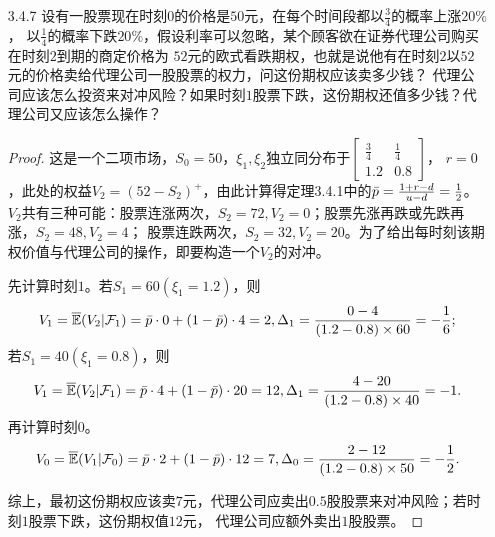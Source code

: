 \begin{enumerate}
\begin{proof}
        与前面对二项市场的分析同理，由$\F_n=\sigma(\xi_1,\cdots,\xi_n)$知$(\Omega,\F_n)$上的
        概率测度$\bP$由$\bP(\xi_i=u_j)(1\leqslant i\leqslant n,1\leqslant j\leqslant k)$全体唯一确定，
        记$p_j^{(i)}=\bP(\xi_i=u_j)$。为使$\bP$是等价鞅测度，对任意$1\leqslant i\leqslant n$，
        同理有$1+r=\bE\xi_i=\sum\limits_{j=1}^kp_j^{(i)}u_j$。当$k\geqslant3$时，由于$u_1<1+r<u_k$，
        故对任意$1\leqslant i\leqslant n$，均有不止一组$(p_1^{(i)},\cdots,p_k^{(i)})$符合要求，如
        \[\bigg(\frac{2u_k+\sum_{j=2}^{k-1}u_j}{n(u_k-u_1)}-\frac{1+r}{u_k-u_1},\frac{1}{n},\cdots,
        \frac{1}{n},\frac{1+r}{u_k-u_1}-\frac{2u_1+\sum_{j=2}^{k-1}u_j}{n(u_k-u_1)}\bigg)\]或
        \[\bigg(\frac{(n+2)u_k+\sum_{j=2}^{k-1}u_j}{2n(u_k-u_1)}-\frac{1+r}{u_k-u_1},\frac{1}{2n},\cdots,
        \frac{1}{2n},\frac{1+r}{u_k-u_1}-\frac{(n+2)u_1+\sum_{j=2}^{k-1}u_j}{2n(u_k-u_1)}\bigg),\]
        此时的$\bP$均与$\P$等价，从而$\P$不唯一。当$k=2$时，可仿照最开始的过程归纳证明$\bP$存在且唯一。

        综上，等价鞅测度存在当且仅当$u_1<1+r<u_k$，等价鞅测度唯一当且仅当$k=2$。
    \end{proof}
    \item[3.4.7] 设有一股票现在时刻$0$的价格是$50$元，在每个时间段都以$\frac{3}{4}$的概率上涨$20\%$，
    以$\frac{1}{4}$的概率下跌$20\%$，假设利率可以忽略，某个顾客欲在证券代理公司购买在时刻$2$到期的商定价格为
    $52$元的欧式看跌期权，也就是说他有在时刻$2$以$52$元的价格卖给代理公司一股股票的权力，问这份期权应该卖多少钱？
    代理公司应该怎么投资来对冲风险？如果时刻$1$股票下跌，这份期权还值多少钱？代理公司又应该怎么操作？
    \begin{proof}
        这是一个二项市场，$S_0=50$，$\xi_1,\xi_2$独立同分布于$\begin{bmatrix}\frac{3}{4}&\frac{1}{4}\\1.2&0.8\end{bmatrix}$，
        $r=0$，此处的权益$V_2=(52-S_2)^+$，由此计算得定理3.4.1中的$\bar{p}=\frac{1+r-d}{u-d}=\frac{1}{2}$。
        $V_2$共有三种可能：股票连涨两次，$S_2=72,V_2=0$；股票先涨再跌或先跌再涨，$S_2=48,V_2=4$；
        股票连跌两次，$S_2=32,V_2=20$。为了给出每时刻该期权价值与代理公司的操作，即要构造一个$V_2$的对冲。

        先计算时刻$1$。若$S_1=60(\xi_1=1.2)$，则\[V_1=\overline{\mathbb{E}}(V_2|\mathcal{F}_1)=\bar{p}\cdot0+(1-\bar{p})\cdot4=2,
        \Delta_1=\frac{0-4}{(1.2-0.8)\times60}=-\frac{1}{6};\]若$S_1=40(\xi_1=0.8)$，则 
        \[V_1=\overline{\mathbb{E}}(V_2|\mathcal{F}_1)=\bar{p}\cdot4+(1-\bar{p})\cdot20=12,\Delta_1=\frac{4-20}{(1.2-0.8)\times40}=-1.\]
        再计算时刻$0$。\[V_0=\overline{\mathbb{E}}(V_1|\mathcal{F}_0)=\bar{p}\cdot2+(1-\bar{p})\cdot12=7,\Delta_0=\frac{2-12}{(1.2-0.8)\times50}=-\frac{1}{2}.\]

        综上，最初这份期权应该卖$7$元，代理公司应卖出$0.5$股股票来对冲风险；若时刻$1$股票下跌，这份期权值$12$元，
        代理公司应额外卖出$1$股股票。
    \end{proof}
\end{enumerate}


